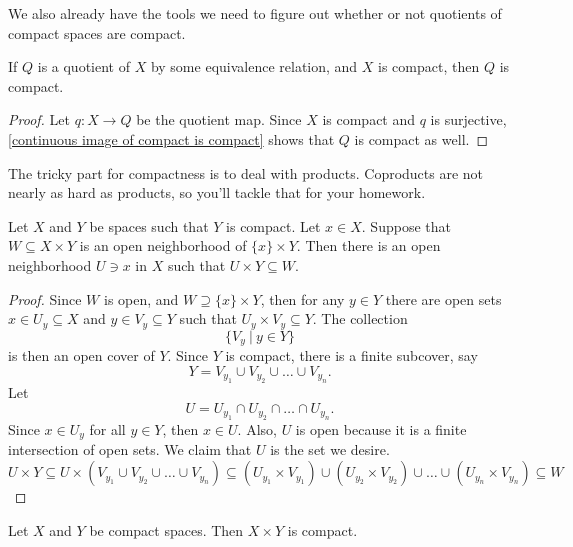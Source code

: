 \documentclass[noname]{notes}
\begin{document}
We also already have the tools we need to figure out whether or not quotients of compact spaces are compact. 

\begin{proposition}
	If $Q$ is a quotient of $X$ by some equivalence relation, and $X$ is compact, then $Q$ is compact. 
\end{proposition}

\begin{proof}
	Let $q \colon X \to Q$ be the quotient map. Since $X$ is compact and $q$ is surjective, \cref{continuous image of compact is compact} shows that $Q$ is compact as well. 
\end{proof}

The tricky part for compactness is to deal with products. Coproducts are not nearly as hard as products, so you'll tackle that for your homework.  

\begin{lemma}
	Let $X$ and $Y$ be spaces such that $Y$ is compact. Let $x \in X$. Suppose that $W \subseteq X \times Y$ is an open neighborhood\footnotemark{} of $\{x\} \times Y$. Then there is an open neighborhood $U \ni x$ in $X$ such that $U \times Y \subseteq W$. 
\end{lemma}

\begin{proof}
	Since $W$ is open, and $W \supseteq \{x\} \times Y$, then for any $y \in Y$ there are open sets $x \in U_y \subseteq X$ and $y \in V_y \subseteq Y$ such that $U_y \times V_y \subseteq Y$. The collection 
	\[
		\Big\{ V_y \ \Big\vert\ y \in Y\Big\}
	\] 
	is then an open cover of $Y$. Since $Y$ is compact, there is a finite subcover, say 
	\[
		Y = V_{y_1} \cup V_{y_2} \cup \ldots \cup V_{y_n}. 
	\]
	Let 
	\[
		U = U_{y_1} \cap U_{y_2} \cap \ldots \cap U_{y_n}. 
	\]
	Since $x \in U_y$ for all $y \in Y$, then $x \in U$. Also, $U$ is open because it is a finite intersection of open sets. We claim that $U$ is the set we desire. 
	\[
		U \times Y \subseteq U \times (V_{y_1} \cup V_{y_2} \cup \ldots \cup V_{y_n}) \subseteq (U_{y_1} \times V_{y_1}) \cup (U_{y_2} \times V_{y_2}) \cup \ldots \cup (U_{y_n} \times V_{y_n}) \subseteq W 
	\]
\end{proof}

\begin{theorem}
	\label{product of compacts is compact}
	Let $X$ and $Y$ be compact spaces. Then $X \times Y$ is compact.  
\end{theorem}
\end{document}
